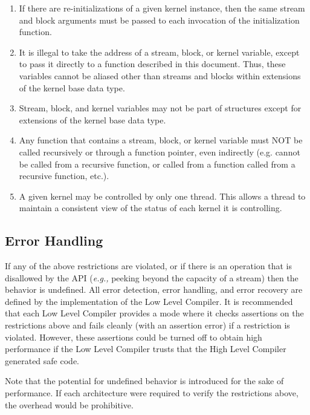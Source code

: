 \begin{enumerate}

\item If there are re-initializations of a given kernel instance, then
the same stream and block arguments must be passed to each invocation
of the initialization function.

\item It is illegal to take the address of a stream, block, or kernel
variable, except to pass it directly to a function described in this
document. Thus, these variables cannot be aliased other than streams
and blocks within extensions of the kernel base data type.

\item Stream, block, and kernel variables may not be part of
structures except for extensions of the kernel base data type.

\item Any function that contains a stream, block, or kernel variable
must NOT be called recursively or through a function pointer, even
indirectly (e.g. cannot be called from a recursive function, or called
from a function called from a recursive function, etc.).

\item A given kernel may be controlled by only one thread.  This
allows a thread to maintain a consistent view of the status of each
kernel it is controlling.

\end{enumerate}

\subsection{Error Handling}
\label{sec:errors}

If any of the above restrictions are violated, or if there is an
operation that is disallowed by the API ({\it e.g.,} peeking beyond
the capacity of a stream) then the behavior is undefined.  All error
detection, error handling, and error recovery are defined by the
implementation of the Low Level Compiler.  It is recommended that each
Low Level Compiler provides a mode where it checks assertions on the
restrictions above and fails cleanly (with an assertion error) if a
restriction is violated.  However, these assertions could be turned
off to obtain high performance if the Low Level Compiler trusts that
the High Level Compiler generated safe code.

Note that the potential for undefined behavior is introduced for the
sake of performance.  If each architecture were required to verify the
restrictions above, the overhead would be prohibitive.

